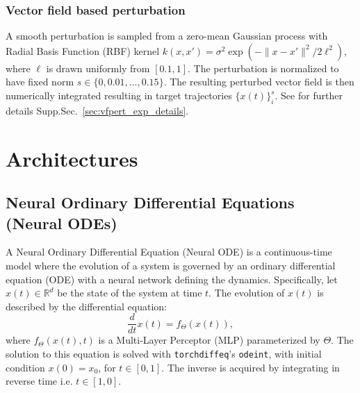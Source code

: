 \documentclass{article}
\theoremstyle{definition} \newtheorem{definition}{Definition}  \newtheorem{example}{Example}
\theoremstyle{remark} \newtheorem{remark}{Remark}
\newcounter{ct}
\begin{document}
\subsubsection{Vector field based perturbation}\label{sec:vfpert_exp_description}
 A smooth perturbation is sampled from a zero-mean Gaussian process with Radial Basis Function (RBF) kernel $k(x, x') = \sigma^2 \exp(-\|x - x'\|^2 / 2\ell^2)$, where $\ell$ is drawn uniformly from $[0.1, 1]$.
The perturbation is normalized to have fixed norm $s \in \{0, 0.01, \dots, 0.15\}$.
%
The resulting perturbed vector field is then numerically integrated resulting in target trajectories $\{x(t)\}_i^s$.
%
See for further details  Supp.Sec.~\ref{sec:vfpert_exp_details}.




\newpage
\section{Architectures}\label{sec:architectures}
\subsection{Neural Ordinary Differential Equations (Neural ODEs)}\label{sec:node}
\citep{chen2018neural,massaroli2020dissecting}
A Neural Ordinary Differential Equation (Neural ODE) is a continuous-time model where the evolution of a system is governed by an ordinary differential equation (ODE) with a neural network defining the dynamics.
Specifically, let \( x(t) \in \mathbb{R}^d \) be the state of the system at time \( t \). 
The evolution of \( x(t) \) is described by the differential equation:
\begin{equation}
    \frac{d}{dt} x(t) = f_\Theta(x(t)),
\end{equation}
where \( f_\Theta(x(t), t) \) is a Multi-Layer Perceptor (MLP) parameterized by \( \Theta \).
The solution to this equation is solved with \texttt{torchdiffeq}'s \texttt{odeint}, with initial condition \( x(0) = x_0 \), for $t\in[0,1]$\citep{torchdiffeq}.
The inverse is acquired by integrating in reverse time i.e. $t\in[1,0]$.
\end{document}
